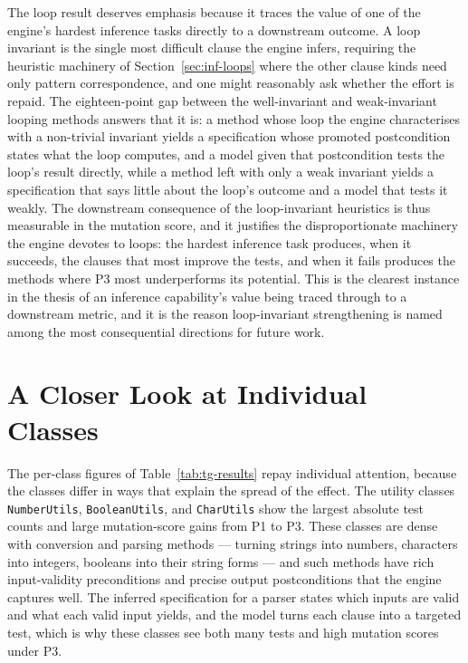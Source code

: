 The loop result deserves emphasis because it traces the value of one of the
engine's hardest inference tasks directly to a downstream outcome. A loop invariant
is the single most difficult clause the engine infers, requiring the heuristic
machinery of Section~\ref{sec:inf-loops} where the other clause kinds need only
pattern correspondence, and one might reasonably ask whether the effort is repaid.
The eighteen-point gap between the well-invariant and weak-invariant looping methods
answers that it is: a method whose loop the engine characterises with a non-trivial
invariant yields a specification whose promoted postcondition states what the loop
computes, and a model given that postcondition tests the loop's result directly,
while a method left with only a weak invariant yields a specification that says
little about the loop's outcome and a model that tests it weakly. The downstream
consequence of the loop-invariant heuristics is thus measurable in the mutation
score, and it justifies the disproportionate machinery the engine devotes to loops:
the hardest inference task produces, when it succeeds, the clauses that most
improve the tests, and when it fails produces the methods where P3 most
underperforms its potential. This is the clearest instance in the thesis of an
inference capability's value being traced through to a downstream metric, and it is
the reason loop-invariant strengthening is named among the most consequential
directions for future work.

\section{A Closer Look at Individual Classes}
\label{sec:tg-perclass}

The per-class figures of Table~\ref{tab:tg-results} repay individual attention,
because the classes differ in ways that explain the spread of the effect. The
utility classes \texttt{NumberUtils}, \texttt{BooleanUtils}, and
\texttt{CharUtils} show the largest absolute test counts and large mutation-score
gains from P1 to P3. These classes are dense with conversion and parsing methods
--- turning strings into numbers, characters into integers, booleans into their
string forms --- and such methods have rich input-validity preconditions and
precise output postconditions that the engine captures well. The inferred
specification for a parser states which inputs are valid and what each valid input
yields, and the model turns each clause into a targeted test, which is why these
classes see both many tests and high mutation scores under P3.

